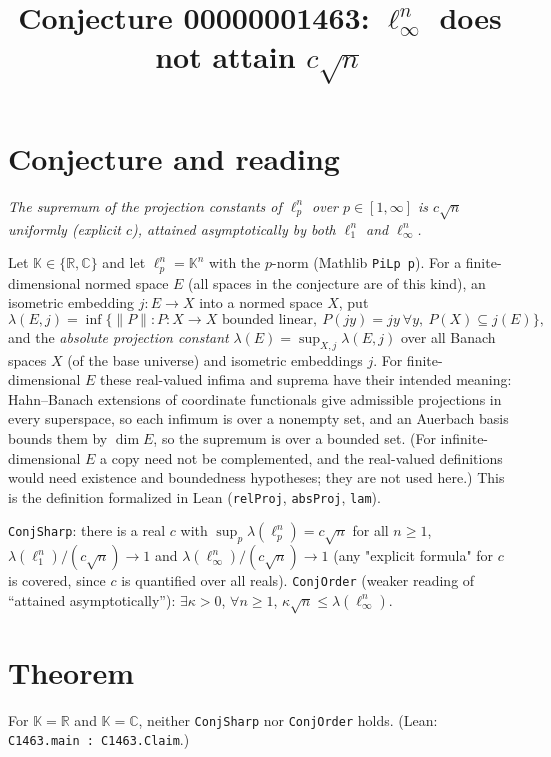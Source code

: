 \documentclass[11pt]{article}
\title{Conjecture 00000001463: $\ell_\infty^n$ does not attain $c\sqrt n$}
\date{}
\begin{document}
\maketitle

\section*{Conjecture and reading}
\emph{The supremum of the projection constants of $\ell_p^n$ over $p\in[1,\infty]$ is $c\sqrt n$ uniformly (explicit $c$), attained asymptotically by both $\ell_1^n$ and $\ell_\infty^n$.}

Let $\mathbb K\in\{\mathbb R,\mathbb C\}$ and let $\ell_p^n=\mathbb K^n$ with the $p$-norm (Mathlib \texttt{PiLp p}). For a finite-dimensional normed space $E$ (all spaces in the conjecture are of this kind), an isometric embedding $j:E\to X$ into a normed space $X$, put
\[
\lambda(E,j)=\inf\{\|P\| : P:X\to X \text{ bounded linear},\ P(jy)=jy\ \forall y,\ P(X)\subseteq j(E)\},
\]
and the \emph{absolute projection constant} $\lambda(E)=\sup_{X,j}\lambda(E,j)$ over all Banach spaces $X$ (of the base universe) and isometric embeddings $j$. For finite-dimensional $E$ these real-valued infima and suprema have their intended meaning: Hahn--Banach extensions of coordinate functionals give admissible projections in every superspace, so each infimum is over a nonempty set, and an Auerbach basis bounds them by $\dim E$, so the supremum is over a bounded set. (For infinite-dimensional $E$ a copy need not be complemented, and the real-valued definitions would need existence and boundedness hypotheses; they are not used here.) This is the definition formalized in Lean (\texttt{relProj}, \texttt{absProj}, \texttt{lam}).

\texttt{ConjSharp}: there is a real $c$ with $\sup_p\lambda(\ell_p^n)=c\sqrt n$ for all $n\ge1$, $\lambda(\ell_1^n)/(c\sqrt n)\to1$ and $\lambda(\ell_\infty^n)/(c\sqrt n)\to1$ (any "explicit formula" for $c$ is covered, since $c$ is quantified over all reals).
\texttt{ConjOrder} (weaker reading of ``attained asymptotically''): $\exists\kappa>0$, $\forall n\ge1$, $\kappa\sqrt n\le\lambda(\ell_\infty^n)$.

\section*{Theorem}
For $\mathbb K=\mathbb R$ and $\mathbb K=\mathbb C$, neither \texttt{ConjSharp} nor \texttt{ConjOrder} holds. (Lean: \texttt{C1463.main : C1463.Claim}.)
\end{document}
